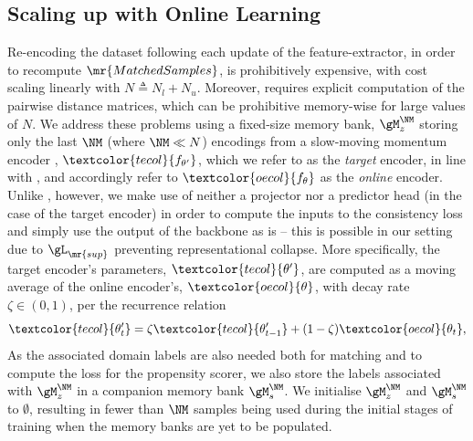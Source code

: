 \subsection{Scaling up with Online Learning}\label{subsec:ol}
%
Re-encoding the dataset following each update of the feature-extractor, in order to recompute
$\mr{MatchedSamples}$, is prohibitively expensive, with cost scaling linearly with $N \triangleq
N_l + N_u$.
%
Moreover, \CNN{} requires explicit computation of the pairwise distance matrices, which can be
prohibitive memory-wise for large values of $N$.
%
We address these problems using a fixed-size memory bank, $\gM^{\NM}_z$ storing only the last $\NM$
(where $\NM \ll N$) encodings from a slow-moving momentum encoder \citep{grill2020bootstrap,
he2020momentum}, $\textcolor{tecol}{f_{\theta^\prime}}$, which we refer to as the
\textcolor{tecol}{\emph{target}} encoder, in line with \citet{grill2020bootstrap}, and accordingly
refer to $\textcolor{oecol}{f_\theta}$ as the \textcolor{oecol}{\emph{online}} encoder.
%
Unlike \citet{grill2020bootstrap}, however, we make use of neither a projector nor a predictor head
(in the case of the target encoder) in order to compute the inputs to the consistency loss and
simply use the output of the backbone as is -- this is possible in our setting due to
$\gL_\mr{sup}$ preventing representational collapse.
%
More specifically, the target encoder's parameters, $\textcolor{tecol}{\theta^\prime}$, are computed as a moving
average of the online encoder's, $\textcolor{oecol}{\theta}$, with decay rate $\zeta \in (0, 1)$, per the recurrence
relation
%
\begin{equation}
  \textcolor{tecol}{\theta^\prime_t} = \zeta \textcolor{tecol}{\theta^\prime_{t - 1}} + (1 - \zeta)
  \textcolor{oecol}{\theta_t},
\end{equation}
%
As the associated domain labels are also needed both for matching and to compute the loss for the
propensity scorer, we also store the labels associated with $\gM^{\NM}_z$ in a companion memory bank
$\gM^{\NM}_s$. 
%
We initialise $\gM^{\NM}_z$ and $\gM^{\NM}_s$ to $\emptyset$, resulting in
fewer than $\NM$ samples being used during the initial stages of training when the memory banks are
yet to be populated.
%

